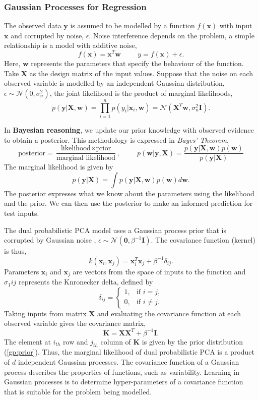 \documentclass[ %
author={Dillon Keith Diep},
supervisor={Dr. Carl Henrik Ek},
degree={MEng},
title={ART-CG Hair:},
subtitle={Assisted Real-time Content Generation of Stylised Virtual Hair},
type={Research},
year={2017} ]{dissertation}
\begin{document}
\subsubsection{Gaussian Processes for Regression}
The observed data $\bm{y}$ is assumed to be modelled by a function $f(\bm{x})$ with input $\bm{x}$ and corrupted by noise, $\epsilon$. Noise interference depends on the problem, a simple relationship is a model with additive noise,
$$f(\bm{x})=\bm{x}^T\bm{w}
\hspace{1cm}
y = f(\bm{x}) + \epsilon.$$
Here, $\bm{w}$ represents the parameters that specify the behaviour of the function. Take $\bm{X}$ as the design matrix of the input values. Suppose that the noise on each observed variable is modelled by an independent Gaussian distribution, $\epsilon\sim\mathcal{N}(0, \sigma^2_n)$, the joint likelihood is the product of marginal likelihoods,
$$p(\bm{y}|\bm{X},\bm{w})=\prod^n_{i=1}p(y_i|\bm{x}_i, \bm{w})=\mathcal{N}(\bm{X}^T\bm{w}, \sigma^2_n\bm{I}).$$

In \textbf{Bayesian reasoning}, we update our prior knowledge with observed evidence to obtain a posterior. This methodology is expressed in \textit{Bayes' Theorem},
$$\text{posterior}=\frac{\text{likelihood}\times\text{prior}}{\text{marginal likelihood}}, \hspace{1cm} p(\bm{w}|\bm{y},\bm{X})=\frac{p(\bm{y}|\bm{X},\bm{w})p(\bm{w})}{p(\bm{y}|\bm{X})}$$
The marginal likelihood is given by
$$p(\bm{y}|\bm{X})=\int p(\bm{y}|\bm{X},\bm{w})p(\bm{w})d\bm{w}.$$
The posterior expresses what we know about the parameters using the likelihood and the prior. We can then use the posterior to make an informed prediction for test inputs.

The dual probabilistic PCA model uses a Gaussian process prior that is corrupted by Gaussian noise \cite{gplvm}, $\epsilon\sim\mathcal{N}(\bm{0},\beta^{-1}\bm{I})$.
The covariance function (kernel) is thus,
\begin{equation} \label{gp:prior}
k(\bm{x}_i,\bm{x}_j)=\bm{x}^T_i\bm{x}_j+\beta^{-1}\delta_{ij}.
\end{equation}
Parameters $\bm{x}_i$ and $\bm{x}_j$ are vectors from the space of inputs to the function and $\sigma_1{ij}$ represents the Knronecker delta, defined by 
$$
\delta_{ij} =
\begin{cases}
1, &         \text{if } i=j,\\
0, &         \text{if } i\neq j.
\end{cases}
$$
Taking inputs from matrix $\bm{X}$ and evaluating the covariance function at each observed variable gives the covariance matrix,
$$\bm{K=XX}^T+\beta^{-1}\bm{I}.$$
The element at $i_{th}$ row and $j_{th}$ column of $\bm{K}$ is given by the prior distribution (\ref{gp:prior}). Thus, the marginal likelihood of dual probabilistic PCA is a product of $d$ independent Gaussian processes. The covariance function of a Gaussian process describes the properties of functions, such as variability. Learning in Gaussian processes is to determine hyper-parameters of a covariance function that is suitable for the problem being modelled.
\end{document}
